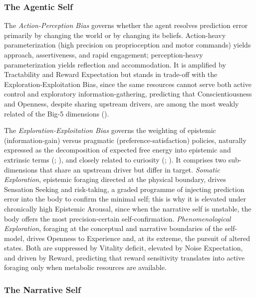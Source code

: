 \documentclass[
  jou,
  floatsintext,
  longtable,
  nolmodern,
  notxfonts,
  notimes,
  12pt,
  colorlinks=true,linkcolor=blue,citecolor=blue,urlcolor=blue]{apa7}
\begin{document}
\subsubsection{The Agentic Self}\label{the-agentic-self}

The \emph{Action-Perception Bias} governs whether the agent resolves
prediction error primarily by changing the world or by changing its
beliefs. Action-heavy parameterization (high precision on proprioception
and motor commands) yields approach, assertiveness, and rapid
engagement; perception-heavy parameterization yields reflection and
accommodation. It is amplified by Tractability and Reward Expectation
but stands in trade-off with the Exploration-Exploitation Bias, since
the same resources cannot serve both active control and exploratory
information-gathering, predicting that Conscientiousness and Openness,
despite sharing upstream drivers, are among the most weakly related of
the Big-5 dimensions ().

The \emph{Exploration-Exploitation Bias} governs the weighting of
epistemic (information-gain) versus pragmatic (preference-satisfaction)
policies, naturally expressed as the decomposition of expected free
energy into epistemic and extrinsic terms
(;
), and closely
related to curiosity (; ). It
comprises two sub-dimensions that share an upstream driver but differ in
target. \emph{Somatic Exploration}, epistemic foraging directed at the
physical boundary, drives Sensation Seeking and risk-taking, a graded
programme of injecting prediction error into the body to confirm the
minimal self; this is why it is elevated under chronically high
Epistemic Arousal, since when the narrative self is unstable, the body
offers the most precision-certain self-confirmation.
\emph{Phenomenological Exploration}, foraging at the conceptual and
narrative boundaries of the self-model, drives Openness to Experience
and, at its extreme, the pursuit of altered states. Both are suppressed
by Vitality deficit, elevated by Noise Expectation, and driven by
Reward, predicting that reward sensitivity translates into active
foraging only when metabolic resources are available.

\subsubsection{The Narrative Self}\label{the-narrative-self}
\end{document}
